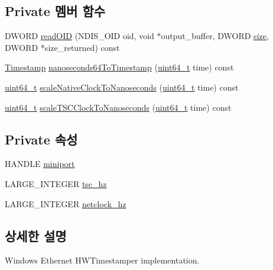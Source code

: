 \subsection*{Private 멤버 함수}
\begin{DoxyCompactItemize}
\item 
D\+W\+O\+RD \hyperlink{class_windows_ether_timestamper_ac5b503366553291b2c8f0a2b1a84219e}{read\+O\+ID} (N\+D\+I\+S\+\_\+\+O\+ID oid, void $\ast$output\+\_\+buffer, D\+W\+O\+RD \hyperlink{gst__avb__playbin_8c_a439227feff9d7f55384e8780cfc2eb82}{size}, D\+W\+O\+RD $\ast$size\+\_\+returned) const 
\item 
\hyperlink{class_timestamp}{Timestamp} \hyperlink{class_windows_ether_timestamper_a7c702f26e7228347c2dd9ca9f481ecb5}{nanoseconds64\+To\+Timestamp} (\hyperlink{parse_8c_aec6fcb673ff035718c238c8c9d544c47}{uint64\+\_\+t} time) const 
\item 
\hyperlink{parse_8c_aec6fcb673ff035718c238c8c9d544c47}{uint64\+\_\+t} \hyperlink{class_windows_ether_timestamper_a4644902a8381abd3a06e9caa3bdd8262}{scale\+Native\+Clock\+To\+Nanoseconds} (\hyperlink{parse_8c_aec6fcb673ff035718c238c8c9d544c47}{uint64\+\_\+t} time) const 
\item 
\hyperlink{parse_8c_aec6fcb673ff035718c238c8c9d544c47}{uint64\+\_\+t} \hyperlink{class_windows_ether_timestamper_ad446fba57a1868632d97b94f032c9e1a}{scale\+T\+S\+C\+Clock\+To\+Nanoseconds} (\hyperlink{parse_8c_aec6fcb673ff035718c238c8c9d544c47}{uint64\+\_\+t} time) const 
\end{DoxyCompactItemize}
\subsection*{Private 속성}
\begin{DoxyCompactItemize}
\item 
H\+A\+N\+D\+LE \hyperlink{class_windows_ether_timestamper_aa64b235fdc4f27df439a7e96278f2d9b}{miniport}
\item 
L\+A\+R\+G\+E\+\_\+\+I\+N\+T\+E\+G\+ER \hyperlink{class_windows_ether_timestamper_a259066718bc34c6231bbefd0b7093b6e}{tsc\+\_\+hz}
\item 
L\+A\+R\+G\+E\+\_\+\+I\+N\+T\+E\+G\+ER \hyperlink{class_windows_ether_timestamper_a9e4ba46145b31b628733af60187fc3c6}{netclock\+\_\+hz}
\end{DoxyCompactItemize}


\subsection{상세한 설명}
Windows Ethernet H\+W\+Timestamper implementation. 

